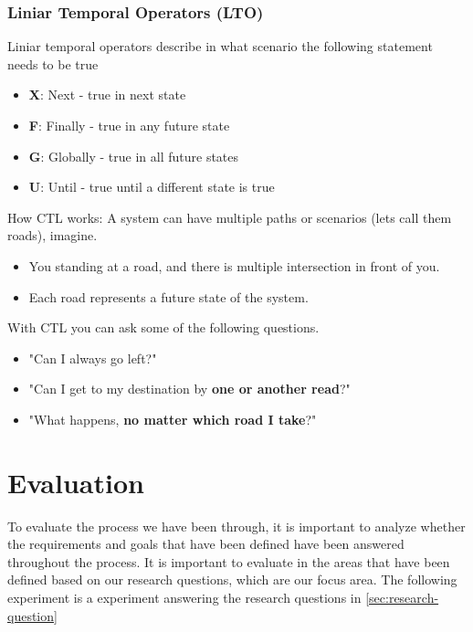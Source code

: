 \subsubsection{Liniar Temporal Operators (LTO)}
Liniar temporal operators describe in what scenario the following statement needs to be true
\begin{itemize}
    \item \textbf{X}: Next - true in next state
    \item \textbf{F}: Finally - true in any future state
    \item \textbf{G}: Globally - true in all future states
    \item \textbf{U}: Until - true until a different state is true
\end{itemize}

\medskip

How CTL works: A system can have multiple paths or scenarios (lets call them roads), imagine.
\begin{itemize}
    \item[] You standing at a road, and there is multiple intersection in front of you.
    \item[] Each road represents a future state of the system.
\end{itemize}
With CTL you can ask some of the following questions.
\begin{itemize}
    \item[] "Can I always go left?"
    \item[] "Can I get to my destination by \textbf{one or another read}?"
    \item[] "What happens, \textbf{no matter which road I take}?"
\end{itemize}

\medskip








\section{Evaluation}
\label{sec:evaluation}
To evaluate the process we have been through, it is important to analyze whether the requirements and goals that have been defined have been answered throughout the process. It is important to evaluate in the areas that have been defined based on our research questions, which are our focus area.
The following experiment is a experiment answering the research questions in \ref{sec:research-question}


